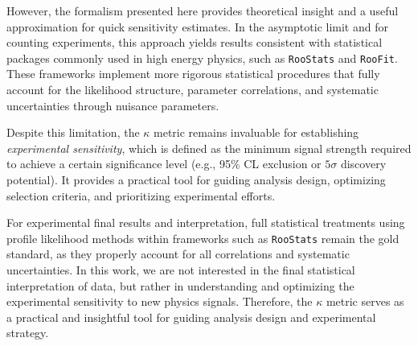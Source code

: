 However, the formalism presented here provides theoretical insight and a useful approximation for quick sensitivity estimates. In the asymptotic limit and for counting experiments, this approach yields results consistent with statistical packages commonly used in high energy physics, such as \texttt{RooStats} and \texttt{RooFit}. These frameworks implement more rigorous statistical procedures that fully account for the likelihood structure, parameter correlations, and systematic uncertainties through nuisance parameters.


Despite this limitation, the $\kappa$ metric remains invaluable for establishing \textit{experimental sensitivity}, which is defined as the minimum signal strength required to achieve a certain significance level (e.g., 95\% CL exclusion or $5\sigma$ discovery potential). It provides a practical tool for guiding analysis design, optimizing selection criteria, and prioritizing experimental efforts. 

For experimental final results and interpretation, full statistical treatments using profile likelihood methods within frameworks such as \texttt{RooStats} remain the gold standard, as they properly account for all correlations and systematic uncertainties. In this work, we are not interested in the final statistical interpretation of data, but rather in understanding and optimizing the experimental sensitivity to new physics signals. Therefore, the $\kappa$ metric serves as a practical and insightful tool for guiding analysis design and experimental strategy.
